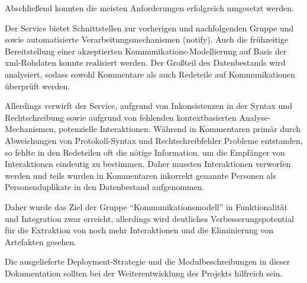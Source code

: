 Abschließend konnten die meisten  Anforderungen
erfolgreich umgesetzt werden.

Der Service bietet Schnittstellen zur vorherigen und nachfolgenden Gruppe und
sowie automatisierte Verarbeitungsmechanismen (notify). Auch die frühzeitige
Bereitstellung einer akzeptierten Kommunikations-Modellierung auf Basis der
\gls{xml}-Rohdaten konnte realisiert werden. Der Großteil des Datenbestands wird
analysiert, sodass sowohl Kommentare als auch Redeteile auf Kommunikationen
überprüft werden.

Allerdings verwirft der Service, aufgrund von Inkonsistenzen in der Syntax und
Rechtschreibung sowie aufgrund von fehlenden kontextbasierten
Analyse-Mechanismen, potenzielle Interaktionen. Während in Kommentaren primär durch
Abweichungen von Protokoll-Syntax und Rechtschreibfehler Probleme entstanden,
so fehlte in den Redeteilen oft die nötige Information, um die Empfänger von
Interaktionen eindeutig zu bestimmen. Daher mussten Interaktionen verworfen
werden und teils wurden in Kommentaren inkorrekt genannte Personen als
Personenduplikate in den Datenbestand aufgenommen.

Daher wurde das Ziel der Gruppe \enquote{Kommunikationsmodell} in Funktionalität und
Integration zwar erreicht, allerdings wird deutliches Verbesserungspotential
für die Extraktion von noch mehr Interaktionen und die Eliminierung von
Artefakten gesehen. 

Die ausgelieferte Deployment-Strategie und die Modulbeschreibungen in dieser
Dokumentation sollten bei der Weiterentwicklung des Projekts hilfreich sein.